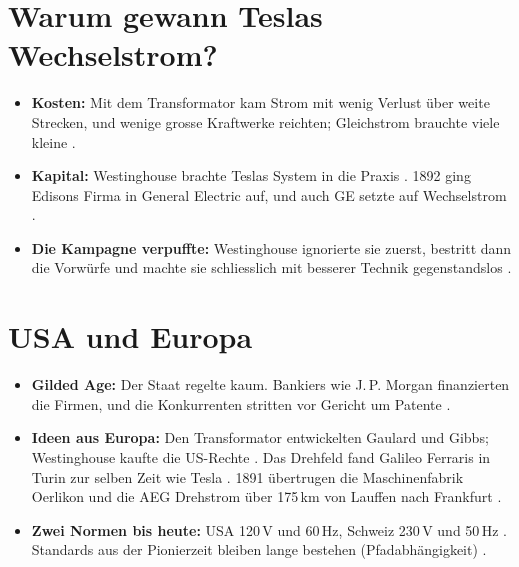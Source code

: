 \documentclass[10pt,a4paper]{article}
\begin{document}
\newpage

\section{Warum gewann Teslas Wechselstrom?}
\begin{itemize}
  \item \textbf{Kosten:} Mit dem Transformator kam Strom mit wenig Verlust über weite Strecken, und wenige grosse
    Kraftwerke reichten; Gleichstrom brauchte viele kleine .
  \item \textbf{Kapital:} Westinghouse brachte Teslas System in die Praxis \cite[994]{kaick}. 1892 ging Edisons Firma
    in General Electric auf, und auch GE setzte auf Wechselstrom .
  \item \textbf{Die Kampagne verpuffte:} Westinghouse ignorierte sie zuerst, bestritt dann die Vorwürfe und machte sie
    schliesslich mit besserer Technik gegenstandslos .
\end{itemize}

\section{USA und Europa}
\begin{itemize}
  \item \textbf{Gilded Age:} Der Staat regelte kaum. Bankiers wie J.\,P. Morgan finanzierten die Firmen, und die
    Konkurrenten stritten vor Gericht um Patente .
  \item \textbf{Ideen aus Europa:} Den Transformator entwickelten Gaulard und Gibbs; Westinghouse kaufte die US-Rechte
    . Das Drehfeld fand Galileo Ferraris in Turin zur selben Zeit wie Tesla . 1891
    übertrugen die Maschinenfabrik Oerlikon und die AEG Drehstrom über 175\,km von Lauffen nach Frankfurt \cite{steig}.
  \item \textbf{Zwei Normen bis heute:} USA 120\,V und 60\,Hz, Schweiz 230\,V und 50\,Hz \cite{iec}. Standards aus
    der Pionierzeit bleiben lange bestehen (Pfadabhängigkeit) .
\end{itemize}
\end{document}
